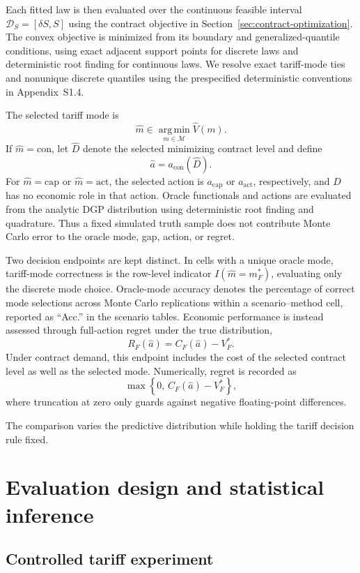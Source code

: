 \documentclass[Times1COL]{WileyNJDv5}
\begin{document}
Each fitted law is then evaluated over the continuous feasible interval
$\mathcal D_S=[\delta S,S]$ using the contract objective in
Section~\ref{sec:contract-optimization}. The convex objective is
minimized from its boundary and generalized-quantile conditions, using
exact adjacent support points for discrete laws and deterministic root
finding for continuous laws. We resolve exact tariff-mode ties and nonunique discrete quantiles
using the prespecified deterministic conventions in Appendix~S1.4.

The selected tariff mode is
\[
\widehat m
\in
\operatorname*{arg\,min}_{m\in\mathcal M}
\widehat V(m).
\]
If $\widehat m=\mathrm{con}$, let $\widehat D$ denote the selected minimizing contract level and define
\[
\widehat a=a_{\mathrm{con}}(\widehat D).
\]
For $\widehat m=\mathrm{cap}$ or $\widehat m=\mathrm{act}$, the selected action is $a_{\mathrm{cap}}$ or $a_{\mathrm{act}}$, respectively, and $D$ has no economic role in that action. Oracle functionals and actions are evaluated from the analytic DGP distribution using deterministic root finding and quadrature. Thus a fixed simulated truth sample does not contribute Monte Carlo error to the oracle mode, gap, action, or regret.

Two decision endpoints are kept distinct. In cells with a unique oracle mode, tariff-mode correctness is the row-level indicator $I(\widehat m=m_F^\ast)$, evaluating only the discrete mode choice. Oracle-mode accuracy denotes the percentage of correct mode selections across Monte Carlo replications within a scenario--method cell, reported as ``Acc.'' in the scenario tables. Economic performance is instead assessed through full-action regret under the true distribution,
\[
R_F(\widehat a)
=
C_F(\widehat a)-V_F^\ast.
\]
Under contract demand, this endpoint includes the cost of the selected contract level as well as the selected mode. Numerically, regret is recorded as
\[
\max\left\{0,\,
C_F(\widehat a)-V_F^\ast
\right\},
\]
where truncation at zero only guards against negative floating-point differences.

The comparison varies the predictive distribution while holding the
tariff decision rule fixed.

\section{Evaluation design and statistical inference}
\label{sec:evaluation-design}

\subsection{Controlled tariff experiment}
\label{sec:controlled-mechanism}
\end{document}
